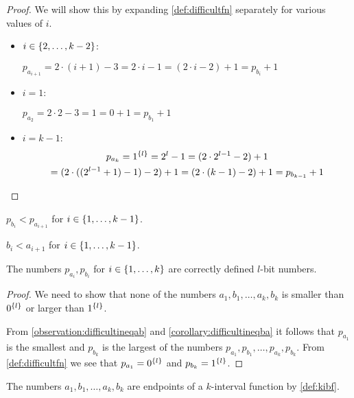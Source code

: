 \begin{proof}
We will show this by expanding \cref{def:difficultfn}
separately for various values of $i$.

\begin{itemize}
\item $i \in \{2, \ldots, k-2\}$:

$p_{a_{i+1}}
= 2 \cdot (i+1) - 3
= 2 \cdot i - 1
= (2 \cdot i - 2) + 1
= p_{b_i} + 1$

\item $i = 1$:

$p_{a_2}
= 2 \cdot 2 - 3
= 1
= 0 + 1
= p_{b_1} + 1$

\item $i = k-1$:
\begin{multline*}
p_{a_k}
= 1^{\{l\}}
= 2^l - 1
= (2 \cdot 2^{l-1} - 2) + 1 \\
= (2 \cdot ((2^{l-1} + 1) - 1) - 2) + 1
= (2 \cdot (k-1) - 2) + 1
= p_{b_{k-1}} + 1
\end{multline*}
\end{itemize}
\end{proof}

\begin{corollary}
\label{corollary:difficultineqba}
$p_{b_i} < p_{a_{i+1}}$
for $i \in \{1, \ldots, k-1\}$.
\end{corollary}

\begin{corollary}
\label{corollary:difficultineqbafull}
$b_i < a_{i+1}$
for $i \in \{1, \ldots, k-1\}$.
\end{corollary}

\begin{observation}
\label{observation:difficultprefixlbit}
The numbers $p_{a_i}, p_{b_i}$
for $i \in \{1, \ldots, k\}$
are correctly defined $l$-bit numbers.
\end{observation}

\begin{proof}
We need to show that none of the numbers $a_1, b_1, \ldots, a_k, b_k$
is smaller than $0^{\{l\}}$
or larger than $1^{\{l\}}$.

From \cref{observation:difficultineqab}
and \cref{corollary:difficultineqba}
it follows that $p_{a_1}$ is the smallest
and $p_{b_k}$ is the largest
of the numbers $p_{a_1}, p_{b_1}, \ldots, p_{a_k}, p_{b_k}$.
From \cref{def:difficultfn} we see that
$p_{a_1} = 0^{\{l\}}$
and $p_{b_k} = 1^{\{l\}}$.
\end{proof}

\begin{observation}
\label{observation:difficultkintfn}
The numbers $a_1, b_1, \ldots, a_k, b_k$
are endpoints of a $k$-interval function
by \cref{def:kibf}.
\end{observation}

